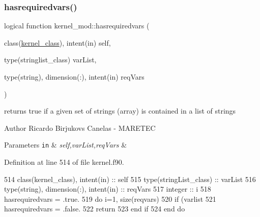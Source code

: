 \subsubsection{\texorpdfstring{hasrequiredvars()}{hasrequiredvars()}}
{\footnotesize\ttfamily logical function kernel\+\_\+mod\+::hasrequiredvars (\begin{DoxyParamCaption}\item[{class(\mbox{\hyperlink{structkernel__mod_1_1kernel__class}{kernel\+\_\+class}}), intent(in)}]{self,  }\item[{type(stringlist\+\_\+class)}]{var\+List,  }\item[{type(string), dimension(\+:), intent(in)}]{req\+Vars }\end{DoxyParamCaption})}



returns true if a given set of strings (array) is contained in a list of strings 

\begin{DoxyAuthor}{Author}
Ricardo Birjukovs Canelas -\/ M\+A\+R\+E\+T\+EC 
\end{DoxyAuthor}

\begin{DoxyParams}[1]{Parameters}
\mbox{\tt in}  & {\em self,var\+List,req\+Vars} & \\
\hline
\end{DoxyParams}


Definition at line 514 of file kernel.\+f90.


\begin{DoxyCode}
514     \textcolor{keywordtype}{class}(kernel\_class), \textcolor{keywordtype}{intent(in)} :: self
515     \textcolor{keywordtype}{type}(stringList\_class) :: varList
516     \textcolor{keywordtype}{type}(string), \textcolor{keywordtype}{dimension(:)}, \textcolor{keywordtype}{intent(in)} :: reqVars
517     \textcolor{keywordtype}{integer} :: i
518     hasrequiredvars = .true.
519     \textcolor{keywordflow}{do} i=1, \textcolor{keyword}{size}(reqvars)
520         \textcolor{keywordflow}{if} (varlist%
521             hasrequiredvars = .false.
522             \textcolor{keywordflow}{return}
523 \textcolor{keywordflow}{        end if}
524 \textcolor{keywordflow}{    end do}
\end{DoxyCode}
\mbox{\label{namespacekernel__mod_a26c62a8eec723402e20142e68ba7ec65}} 
